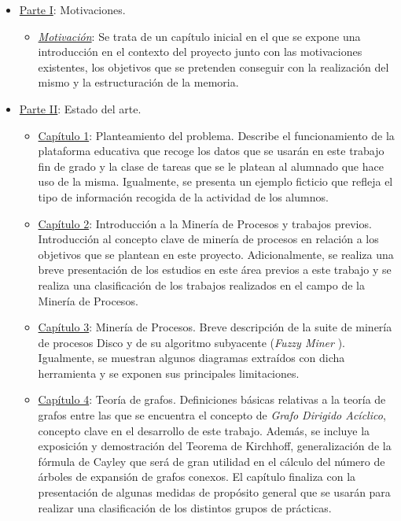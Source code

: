 \begin{itemize}
\item \hyperref[sec:parteI]{Parte I}: Motivaciones.
\begin{itemize}
\item \hyperref[sec:motivation]{\emph{Motivación}}: Se trata de un capítulo inicial en el que se expone una introducción en el contexto del proyecto junto con las motivaciones existentes, los objetivos que se pretenden conseguir con la realización del mismo y la estructuración de la memoria.
\end{itemize}
\item \hyperref[sec:parteII]{Parte II}: Estado del arte.
\begin{itemize}
\item \hyperref[sec:chapterI]{Capítulo 1}: Planteamiento del problema. Describe el funcionamiento de la plataforma educativa que recoge los datos que se usarán en este trabajo fin de grado y la clase de tareas que se le platean al alumnado que hace uso de la misma. Igualmente, se presenta un ejemplo ficticio que refleja el tipo de información recogida de la actividad de los alumnos.
\item \hyperref[sec:chapterII]{Capítulo 2}: Introducción a la Minería de Procesos y trabajos previos. Introducción al concepto clave de minería de procesos en relación a los objetivos que se plantean en este proyecto. Adicionalmente, se realiza una breve presentación de los estudios en este área previos a este trabajo y se realiza una clasificación de los trabajos realizados en el campo de la Minería de Procesos.
\item \hyperref[sec:chapterIII]{Capítulo 3}: Minería de Procesos. Breve descripción de la suite de minería de procesos Disco \cite{gunther2012disco} y de su algoritmo subyacente (\emph{Fuzzy Miner} \cite{gunther2007fuzzy}). Igualmente, se muestran algunos diagramas extraídos con dicha herramienta y se exponen sus principales limitaciones.
\item \hyperref[sec:chapterV]{Capítulo 4}: Teoría de grafos. Definiciones básicas relativas a la teoría de grafos entre las que se encuentra el concepto de \emph{Grafo Dirigido Acíclico}, concepto clave en el desarrollo de este trabajo. Además, se incluye la exposición y demostración del Teorema de Kirchhoff, generalización de la fórmula de Cayley que será de gran utilidad en el cálculo del número de árboles de expansión de grafos conexos. El capítulo finaliza con la presentación de algunas medidas de propósito general que se usarán para realizar una clasificación de los distintos grupos de prácticas.

\end{itemize}
\end{itemize}
